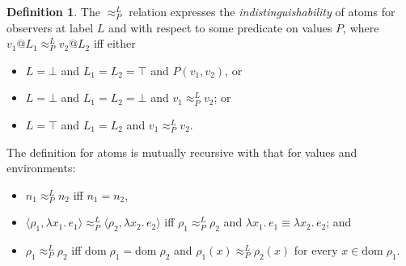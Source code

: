 \documentclass{article}
\makeatletter
\newcommand{\at}{\ensuremath{{\scriptstyle{@}}}}
\theoremstyle{definition}
\newtheorem{definition}{Definition}
\makeatother
\begin{document}
\begin{definition}
  The $\approx^{L}_{P}$ relation expresses the \emph{indistinguishability} of
  atoms for observers at label $L$ and with respect to some predicate on values
  $P$, where $v_1 \at L_1 \approx^{L}_{P} v_2 \at L_2$ iff either
  \begin{itemize}
  \item $L = \bot$ and
    $L_1 = L_2 = \top$ and $P(v_1, v_2)$, or
  \item $L = \bot$ and
    $L_1 = L_2 = \bot$ and $v_1 \approx^{L}_{P} v_2$; or
  \item $L = \top$ and $L_1 = L_2$ and $v_1 \approx^{L}_{P} v_2$.
  \end{itemize}
  The definition for atoms is mutually recursive with that for values and
  environments:
  \begin{itemize}
  \item $n_1 \approx^{L}_{P} n_2$ iff $n_1 = n_2$,
  \item
    $\langle{\rho_1, \lambda{x_1}.\, e_1\rangle} \approx^{L}_{P}
    \langle{\rho_2, \lambda{x_2}.\, e_2\rangle}$ iff
    $\rho_1 \approx^{L}_{P} \rho_2$ and
    $\lambda{x_1}.\, e_1 \equiv \lambda{x_2}.\, e_2$; and
  \item $\rho_1 \approx^{L}_{P} \rho_2$ iff
    $\mathrm{dom}\; \rho_1 = \mathrm{dom}\; \rho_2$ and
    $\rho_1(x) \approx^{L}_{P} \rho_2(x)$ for every
    $x \in \mathrm{dom}\; \rho_1$.
  \end{itemize}
  \label{def:indistinguishability}
\end{definition}
\end{document}

